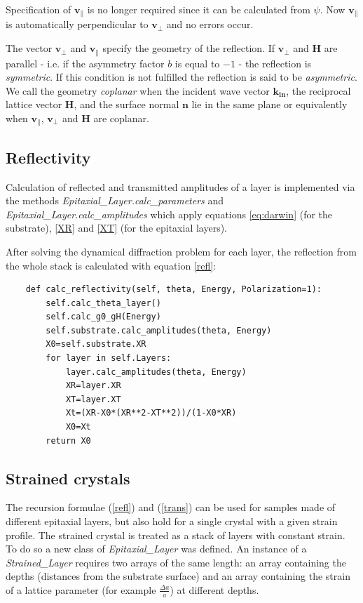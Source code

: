 \documentclass[12pt,oneside,notitlepage,abstracton,a4paper]{scrartcl}
\begin{document}
Specification of $\mathbf{v_\parallel}$ is no longer required since it can be calculated from $\psi$. Now $\mathbf{v_\parallel}$ is automatically perpendicular to $\mathbf{v_\perp}$ and no errors occur.

The vector $\mathbf{v_\perp}$ and $\mathbf{v_\parallel}$ specify the geometry of the reflection.
If $\mathbf{v_\perp}$ and $\mathbf{H}$ are parallel - i.e. if the asymmetry factor $b$ is equal to $-1$ - the reflection is \textit{symmetric}. If this condition is not fulfilled the reflection is said to be \textit{asymmetric}.
We call the geometry \textit{coplanar} when the incident wave vector $\mathbf{k_{in}}$, the reciprocal lattice vector $\mathbf{H}$, and the surface normal $\mathbf{n}$ lie in the same plane or equivalently when $\mathbf{v_\parallel}$, $\mathbf{v_\perp}$ and $\mathbf{H}$ are coplanar.



\subsection{Reflectivity}
Calculation of reflected and transmitted amplitudes of a layer is implemented via the methods \textit{Epitaxial\_Layer.calc\_parameters} and \textit{Epitaxial\_Layer.calc\_amplitudes} which apply equations \ref{eq:darwin} (for the substrate), \ref{XR} and \ref{XT} (for the epitaxial layers).

After solving the dynamical diffraction problem for each layer, the reflection from the whole stack is calculated with equation \ref{refl}:
\begin{lstlisting}
    def calc_reflectivity(self, theta, Energy, Polarization=1):
        self.calc_theta_layer()
        self.calc_g0_gH(Energy)
        self.substrate.calc_amplitudes(theta, Energy)
        X0=self.substrate.XR
        for layer in self.Layers:
            layer.calc_amplitudes(theta, Energy)
            XR=layer.XR
            XT=layer.XT
            Xt=(XR-X0*(XR**2-XT**2))/(1-X0*XR)
            X0=Xt
        return X0
\end{lstlisting}


\subsection{Strained crystals} \label{strcr}
The recursion formulae (\ref{refl}) and (\ref{trans}) can be used for samples made of different epitaxial layers, but also hold for a single crystal with a given strain profile. The strained crystal is treated as a stack of layers with constant strain. To do so a new class of \textit{Epitaxial\_Layer} was defined. An instance of a \textit{Strained\_Layer} requires two arrays of the same length: an array containing the depths (distances from the substrate surface) and an array containing the strain of a lattice parameter (for example $\frac{\Delta a}{a}$) at different depths.
\end{document}

